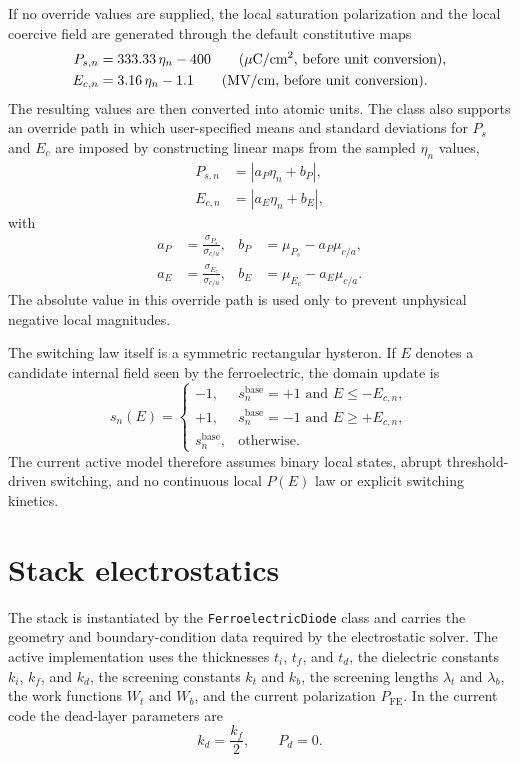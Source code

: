 \documentclass[11pt]{article}
\newcommand{\uc}{\ensuremath{\mu\text{C}/\text{cm}^2}}
\newcommand{\mvcm}{\ensuremath{\text{MV}/\text{cm}}}
\begin{document}
If no override values are supplied, the local saturation polarization and the
local coercive field are generated through the default constitutive maps
\begin{align}
P_{s,n} &= 333.33\,\eta_n - 400
\qquad \text{(\uc, before unit conversion)}, \label{eq:ps-map-mifm} \\
E_{c,n} &= 3.16\,\eta_n - 1.1
\qquad \text{(\mvcm, before unit conversion)}. \label{eq:ec-map-mifm}
\end{align}
The resulting values are then converted into atomic units. The class also
supports an override path in which user-specified means and standard deviations
for $P_s$ and $E_c$ are imposed by constructing linear maps from the sampled
$\eta_n$ values,
\begin{align}
P_{s,n} &= \left| a_P \eta_n + b_P \right|, \\
E_{c,n} &= \left| a_E \eta_n + b_E \right|,
\end{align}
with
\begin{align}
a_P &= \frac{\sigma_{P_s}}{\sigma_{c/a}},
&
b_P &= \mu_{P_s} - a_P \mu_{c/a}, \\
a_E &= \frac{\sigma_{E_c}}{\sigma_{c/a}},
&
b_E &= \mu_{E_c} - a_E \mu_{c/a}.
\end{align}
The absolute value in this override path is used only to prevent unphysical
negative local magnitudes.

The switching law itself is a symmetric rectangular hysteron. If $E$ denotes a
candidate internal field seen by the ferroelectric, the domain update is
\begin{equation}
s_n(E) =
\begin{cases}
-1, & s_n^{\mathrm{base}} = +1 \text{ and } E \le -E_{c,n}, \\
+1, & s_n^{\mathrm{base}} = -1 \text{ and } E \ge +E_{c,n}, \\
s_n^{\mathrm{base}}, & \text{otherwise}.
\end{cases}
\label{eq:switch-rule-mifm}
\end{equation}
The current active model therefore assumes binary local states, abrupt
threshold-driven switching, and no continuous local $P(E)$ law or explicit
switching kinetics.

\section{Stack electrostatics}

The stack is instantiated by the \texttt{FerroelectricDiode} class and carries
the geometry and boundary-condition data required by the electrostatic solver.
The active implementation uses the thicknesses $t_i$, $t_f$, and $t_d$, the
dielectric constants $k_i$, $k_f$, and $k_d$, the screening constants
$k_t$ and $k_b$, the screening lengths $\lambda_t$ and $\lambda_b$, the work
functions $W_t$ and $W_b$, and the current polarization
$P_{\mathrm{FE}}$. In the current code the dead-layer parameters are
\begin{equation}
k_d = \frac{k_f}{2},
\qquad
P_d = 0.
\label{eq:dead-layer-active-mifm}
\end{equation}
\end{document}
